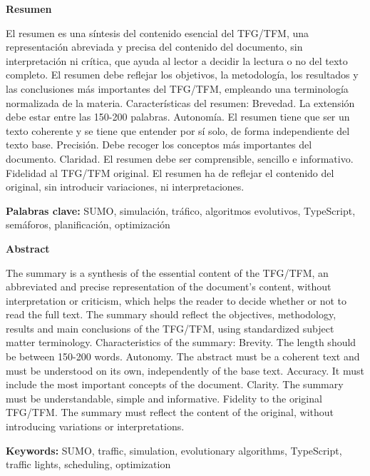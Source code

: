 \pagestyle{empty}

\begin{center}
    \textbf{Resumen}
\end{center}

El resumen es una síntesis del contenido esencial del TFG/TFM, una representación abreviada y precisa del contenido del documento, sin interpretación ni crítica, que ayuda al lector a decidir la lectura o no del texto completo. El resumen debe reflejar los objetivos, la metodología, los resultados y las conclusiones más importantes del TFG/TFM, empleando una terminología normalizada de la materia. Características del resumen: Brevedad. La extensión debe estar entre las 150-200 palabras. Autonomía. El resumen tiene que ser un texto coherente y se tiene que entender por sí solo, de forma independiente del texto base. Precisión. Debe recoger los conceptos más importantes del documento. Claridad. El resumen debe ser comprensible, sencillo e informativo. Fidelidad al TFG/TFM original. El resumen ha de reflejar el contenido del original, sin introducir variaciones, ni interpretaciones.


\medskip

\noindent \textbf{Palabras clave:} SUMO, simulación, tráfico, algoritmos evolutivos, TypeScript, semáforos, planificación, optimización

\bigskip
\bigskip

\begin{center}
    \textbf{Abstract}
\end{center}

The summary is a synthesis of the essential content of the TFG/TFM, an abbreviated and precise representation of the document's content, without interpretation or criticism, which helps the reader to decide whether or not to read the full text. The summary should reflect the objectives, methodology, results and main conclusions of the TFG/TFM, using standardized subject matter terminology. Characteristics of the summary: Brevity. The length should be between 150-200 words. Autonomy. The abstract must be a coherent text and must be understood on its own, independently of the base text. Accuracy. It must include the most important concepts of the document. Clarity. The summary must be understandable, simple and informative. Fidelity to the original TFG/TFM. The summary must reflect the content of the original, without introducing variations or interpretations.

\medskip

\noindent \textbf{Keywords:} SUMO, traffic, simulation, evolutionary algorithms, TypeScript, traffic lights, scheduling, optimization

